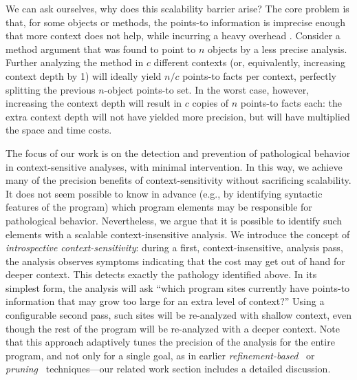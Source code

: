 We can ask ourselves, why does this scalability barrier arise? The
core problem is that, for some objects or methods, the points-to
information is imprecise enough that more context does not help, while
incurring a heavy overhead \cite{popl:2011:Smaragdakis}. Consider a method
argument that was found to point to $n$ objects by a less precise
analysis. Further analyzing the method in $c$ different contexts (or,
equivalently, increasing context depth by 1) will ideally yield $n/c$
points-to facts per context, perfectly splitting the previous
$n$-object points-to set.
In the worst case, however, increasing the context depth will result
in $c$ copies of $n$ points-to facts each: the extra context depth
will not have yielded more precision, but will have multiplied the
space and time costs.

The focus of our work is on the detection and prevention of
pathological behavior in context-sensitive analyses, with minimal
intervention. In this way, we achieve many of the precision benefits
of context-sensitivity without sacrificing scalability. It does not
seem possible to know in advance (e.g., by identifying syntactic
features of the program) which program elements may be responsible for
pathological behavior. Nevertheless, we argue that it is possible to
identify such elements with a scalable context-insensitive analysis.
We introduce the concept of \emph{introspective context-sensitivity}:
during a first, context-insensitive, analysis pass, the analysis
observes symptoms indicating that the cost may get out of hand for
deeper context. This detects exactly the pathology identified
above. In its simplest form, the analysis will ask ``which program
sites currently have points-to information that may grow too large for
an extra level of context?''  Using a configurable second pass, such
sites will be re-analyzed with shallow context, even though the rest
of the program will be re-analyzed with a deeper context. Note that
this approach adaptively tunes the precision of the analysis for the
entire program, and not only for a single goal, as in earlier
\emph{refinement-based}~\cite{pldi:2006:Sridharan} or
\emph{pruning}~\cite{pldi:2011:Liang} techniques---our
related work section includes a detailed discussion.



